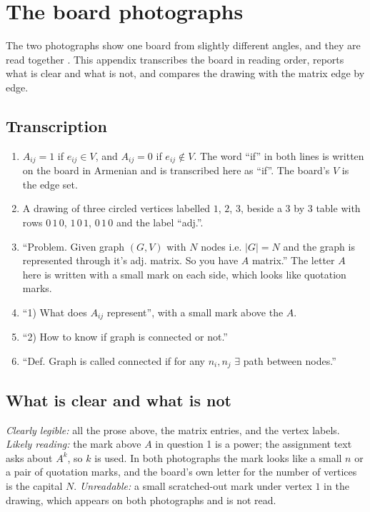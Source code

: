 \section{The board photographs}\label{app:photographs}

The two photographs show one board from slightly different angles, and they are read together \cite{whiteboard1,whiteboard2}.
This appendix transcribes the board in reading order, reports what is clear and what is not, and compares the drawing with the matrix edge by edge.

\subsection{Transcription}\label{sec:transcription}

\begin{enumerate}
\item $A_{ij}=1$ if $e_{ij}\in V$, and $A_{ij}=0$ if $e_{ij}\notin V$.
The word ``if'' in both lines is written on the board in Armenian and is transcribed here as ``if''.
The board's $V$ is the edge set.
\item A drawing of three circled vertices labelled $1$, $2$, $3$, beside a $3$ by $3$ table with rows $0\,1\,0$, $1\,0\,1$, $0\,1\,0$ and the label ``adj.''.
\item ``Problem. Given graph $(G,V)$ with $N$ nodes i.e. $|G|=N$ and the graph is represented through it's adj. matrix. So you have $A$ matrix.''
The letter $A$ here is written with a small mark on each side, which looks like quotation marks.
\item ``1) What does $A_{ij}$ represent'', with a small mark above the $A$.
\item ``2) How to know if graph is connected or not.''
\item ``Def. Graph is called connected if for any $n_i,n_j$ $\exists$ path between nodes.''
\end{enumerate}

\subsection{What is clear and what is not}\label{sec:clarity}

\emph{Clearly legible:} all the prose above, the matrix entries, and the vertex labels.
\emph{Likely reading:} the mark above $A$ in question 1 is a power; the assignment text asks about $A^k$, so $k$ is used.
In both photographs the mark looks like a small $n$ or a pair of quotation marks, and the board's own letter for the number of vertices is the capital $N$.
\emph{Unreadable:} a small scratched-out mark under vertex $1$ in the drawing, which appears on both photographs and is not read.

